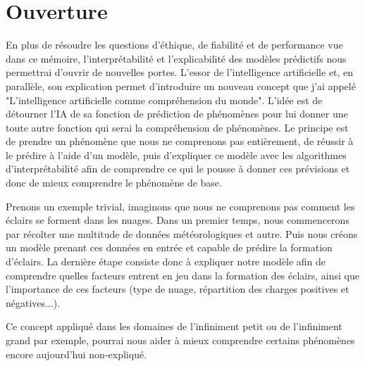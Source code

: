 \chapter*{Ouverture}

En plus de résoudre les questions d'éthique, de fiabilité et de performance vue dans ce mémoire, l'interprétabilité et l'explicabilité des modèles prédictifs nous permettrai d'ouvrir de nouvelles portes. L'essor de l'intelligence artificielle et, en parallèle, son explication permet d'introduire un nouveau concept que j'ai appelé "L'intelligence artificielle comme compréhension du monde". L'idée est de détourner l'IA de sa fonction de prédiction de phénomènes pour lui donner une toute autre fonction qui serai la compréhension de phénomènes. Le principe est de prendre un phénomène que nous ne comprenons pas entièrement, de réussir à le prédire à l'aide d'un modèle, puis d'expliquer ce modèle avec les algorithmes d'interprétabilité afin de comprendre ce qui le pousse à donner ces prévisions et donc de mieux comprendre le phénomène de base.\par
Prenons un exemple trivial, imaginons que nous ne comprenons pas comment les éclairs se forment dans les nuages. Dans un premier temps, nous commencerons par récolter une multitude de données météorologiques et autre. Puis nous créons un modèle prenant ces données en entrée et capable de prédire la formation d'éclairs. La dernière étape consiste donc à expliquer notre modèle afin de comprendre quelles facteurs entrent en jeu dans la formation des éclairs, ainsi que l'importance de ces facteurs (type de nuage, répartition des charges positives et négatives...).\par
Ce concept appliqué dans les domaines de l'infiniment petit ou de l'infiniment grand par exemple, pourrai nous aider à mieux comprendre certains phénomènes encore aujourd'hui non-expliqué.